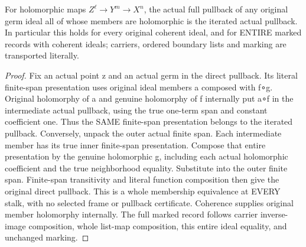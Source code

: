 \begin{lemma}
\label{hir:submersion-choice-image-trace-whole-pullback}
\leanok

For holomorphic maps $Z^ℓ→Y^m→X^n$, the actual full pullback of any original germ ideal all of whose members are holomorphic is the iterated actual pullback. In particular this holds for every original coherent ideal, and for ENTIRE marked records with coherent ideals; carriers, ordered boundary lists and marking are transported literally.
\end{lemma}
\begin{proof}
Fix an actual point z and an actual germ in the direct pullback. Its literal finite-span presentation uses original ideal members a composed with f∘g. Original holomorphy of a and genuine holomorphy of f internally put a∘f in the intermediate actual pullback, using the true one-term span and constant coefficient one. Thus the SAME finite-span presentation belongs to the iterated pullback. Conversely, unpack the outer actual finite span. Each intermediate member has its true inner finite-span presentation. Compose that entire presentation by the genuine holomorphic g, including each actual holomorphic coefficient and the true neighborhood equality. Substitute into the outer finite span. Finite-span transitivity and literal function composition then give the original direct pullback. This is a whole membership equivalence at EVERY stalk, with no selected frame or pullback certificate. Coherence supplies original member holomorphy internally. The full marked record follows carrier inverse-image composition, whole list-map composition, this entire ideal equality, and unchanged marking.
\end{proof}

